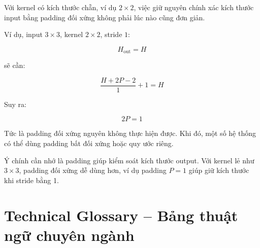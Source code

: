 Với kernel có kích thước chẵn, ví dụ $2\times2$, việc giữ nguyên chính xác kích thước input bằng padding đối xứng không phải lúc nào cũng đơn giản.

Ví dụ, input $3\times3$, kernel $2\times2$, stride $1$:

\[
    H_{\text{out}} = H
\]

sẽ cần:

\[
    \frac{H+2P-2}{1}+1=H
\]

Suy ra:

\[
    2P=1
\]

Tức là padding đối xứng nguyên không thực hiện được. Khi đó, một số hệ thống có thể dùng padding bất đối xứng hoặc quy ước riêng.

\begin{luuy}
Ý chính cần nhớ là padding giúp kiểm soát kích thước output. Với kernel lẻ như $3\times3$, padding đối xứng dễ dùng hơn, ví dụ padding $P=1$ giúp giữ kích thước khi stride bằng 1.
\end{luuy}

\section{Technical Glossary -- Bảng thuật ngữ chuyên ngành}

